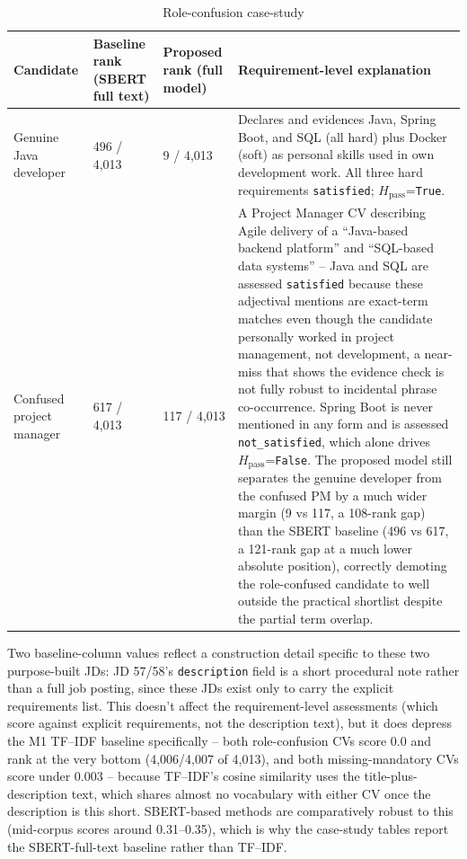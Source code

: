 \documentclass[12pt,a4paper,oneside]{report}
\begin{document}
\begin{table}[htbp]
\centering
\caption{Role-confusion case-study}
\label{tab:role-confusion-case}
\begin{tabularx}{\textwidth}{p{}p{}p{}X}
\toprule
Candidate & Baseline rank (SBERT full text) & Proposed rank (full model) & Requirement-level explanation \\
\midrule
Genuine Java developer & 496 / 4,013 & 9 / 4,013 & Declares and evidences Java, Spring Boot, and SQL (all hard) plus Docker (soft) as personal skills used in own development work. All three hard requirements \texttt{satisfied}; $H_{\mathrm{pass}}$=\texttt{True}. \\
Confused project manager & 617 / 4,013 & 117 / 4,013 & A Project Manager CV describing Agile delivery of a ``Java-based backend platform'' and ``SQL-based data systems'' -- Java and SQL are assessed \texttt{satisfied} because these adjectival mentions are exact-term matches even though the candidate personally worked in project management, not development, a near-miss that shows the evidence check is not fully robust to incidental phrase co-occurrence. Spring Boot is never mentioned in any form and is assessed \texttt{not\_satisfied}, which alone drives $H_{\mathrm{pass}}$=\texttt{False}. The proposed model still separates the genuine developer from the confused PM by a much wider margin (9 vs 117, a 108-rank gap) than the SBERT baseline (496 vs 617, a 121-rank gap at a much lower absolute position), correctly demoting the role-confused candidate to well outside the practical shortlist despite the partial term overlap. \\
\bottomrule
\end{tabularx}
\end{table}

Two baseline-column values reflect a construction detail specific to these two purpose-built JDs: JD 57/58's \texttt{description} field is a short procedural note rather than a full job posting, since these JDs exist only to carry the explicit requirements list. This doesn't affect the requirement-level assessments (which score against explicit requirements, not the description text), but it does depress the M1 TF--IDF baseline specifically -- both role-confusion CVs score $0.0$ and rank at the very bottom (4,006/4,007 of 4,013), and both missing-mandatory CVs score under $0.003$ -- because TF--IDF's cosine similarity uses the title-plus-description text, which shares almost no vocabulary with either CV once the description is this short. SBERT-based methods are comparatively robust to this (mid-corpus scores around 0.31--0.35), which is why the case-study tables report the SBERT-full-text baseline rather than TF--IDF.
\end{document}
